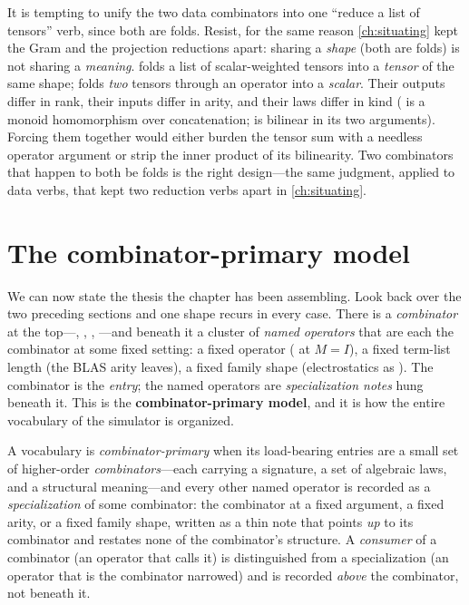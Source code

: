 \begin{pitfall}
It is tempting to unify the two data combinators into one ``reduce a list of
tensors'' verb, since both are folds. Resist, for the same reason \cref{ch:situating}
kept the Gram and the projection reductions apart: sharing a \emph{shape} (both are
folds) is not sharing a \emph{meaning}.  folds a list of
scalar-weighted tensors into a \emph{tensor} of the same shape; 
folds \emph{two} tensors through an operator into a \emph{scalar}. Their outputs
differ in rank, their inputs differ in arity, and their laws differ in kind
( is a monoid homomorphism over concatenation;
 is bilinear in its two arguments). Forcing them together would
either burden the tensor sum with a needless operator argument or strip the inner
product of its bilinearity. Two combinators that happen to both be folds is the
right design---the same judgment, applied to data verbs, that kept two reduction
verbs apart in \cref{ch:situating}.
\end{pitfall}

\section{The combinator-primary model}
\label{sec:primary}

We can now state the thesis the chapter has been assembling. Look back over the two
preceding sections and one shape recurs in every case. There is a \emph{combinator}
at the top---, , ,
---and beneath it a cluster of \emph{named operators} that are
each the combinator at some fixed setting: a fixed operator ( at
$M = I$), a fixed term-list length (the BLAS arity leaves), a fixed family shape
(electrostatics as ). The combinator is the \emph{entry}; the
named operators are \emph{specialization notes} hung beneath it. This is the
\textbf{combinator-primary model}, and it is how the entire vocabulary of the
simulator is organized.

\begin{definition}
\label{def:primary}
A vocabulary is \emph{combinator-primary} when its load-bearing entries are a small
set of higher-order \emph{combinators}---each carrying a signature, a set of
algebraic laws, and a structural meaning---and every other named operator is
recorded as a \emph{specialization} of some combinator: the combinator at a fixed
argument, a fixed arity, or a fixed family shape, written as a thin note that points
\emph{up} to its combinator and restates none of the combinator's structure. A
\emph{consumer} of a combinator (an operator that calls it) is distinguished from a
specialization (an operator that is the combinator narrowed) and is recorded
\emph{above} the combinator, not beneath it.
\end{definition}


